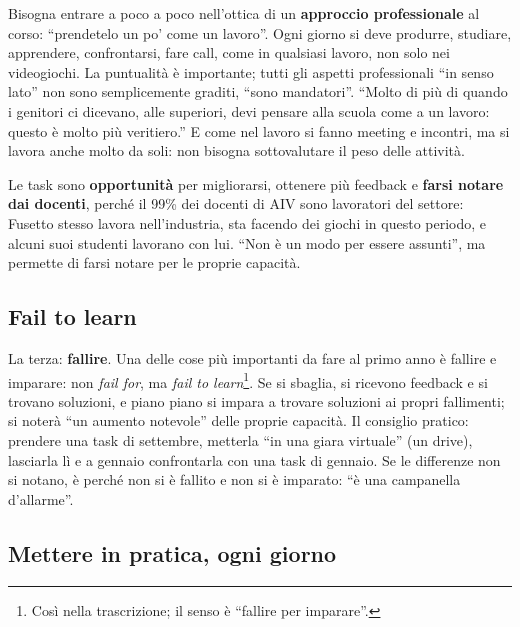 Bisogna entrare a poco a poco nell'ottica di un \textbf{approccio
professionale} al corso: ``prendetelo un po' come un lavoro''. Ogni giorno
si deve produrre, studiare, apprendere, confrontarsi, fare call, come in
qualsiasi lavoro, non solo nei videogiochi. La puntualità è importante;
tutti gli aspetti professionali ``in senso lato'' non sono semplicemente
graditi, ``sono mandatori''. ``Molto di più di quando i genitori ci dicevano,
alle superiori, devi pensare alla scuola come a un lavoro: questo è molto più
veritiero.'' E come nel lavoro si fanno meeting e incontri, ma si lavora
anche molto da soli: non bisogna sottovalutare il peso delle attività.

Le task sono \textbf{opportunità} per migliorarsi, ottenere più feedback e
\textbf{farsi notare dai docenti}, perché il 99\% dei docenti di AIV sono
lavoratori del settore: Fusetto stesso lavora nell'industria, sta facendo dei
giochi in questo periodo, e alcuni suoi studenti lavorano con lui. ``Non è un
modo per essere assunti'', ma permette di farsi notare per le proprie
capacità.

\subsection{Fail to learn}

La terza: \textbf{fallire}. Una delle cose più importanti da fare al primo
anno è fallire e imparare: non \emph{fail for}, ma \emph{fail to
learn}\footnote{Così nella trascrizione; il senso è ``fallire per
imparare''.}. Se si sbaglia, si ricevono feedback e si trovano soluzioni, e
piano piano si impara a trovare soluzioni ai propri fallimenti; si noterà
``un aumento notevole'' delle proprie capacità. Il consiglio pratico:
prendere una task di settembre, metterla ``in una giara virtuale'' (un
drive), lasciarla lì e a gennaio confrontarla con una task di gennaio. Se le
differenze non si notano, è perché non si è fallito e non si è imparato: ``è
una campanella d'allarme''.

\subsection{Mettere in pratica, ogni giorno}

